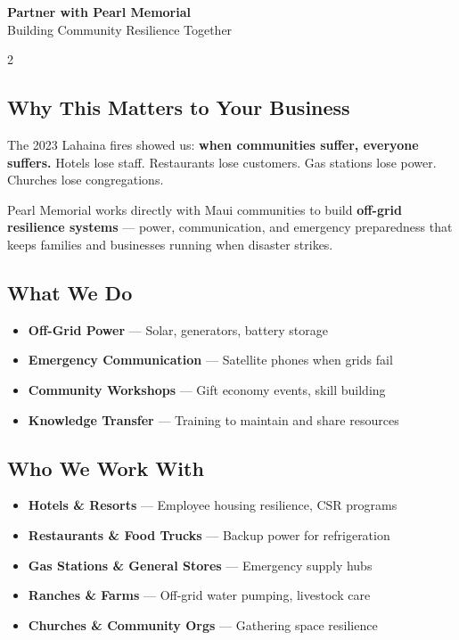 \documentclass[9pt,a4paper]{article}
\begin{document}
\begin{center}
{\LARGE \textbf{Partner with Pearl Memorial}}\\[3pt]
{\large Building Community Resilience Together}
\end{center}

\vspace{8pt}

\begin{multicols}{2}

\subsection*{Why This Matters to Your Business}
The 2023 Lahaina fires showed us: \textbf{when communities suffer, everyone suffers.} Hotels lose staff. Restaurants lose customers. Gas stations lose power. Churches lose congregations.

Pearl Memorial works directly with Maui communities to build \textbf{off-grid resilience systems} — power, communication, and emergency preparedness that keeps families and businesses running when disaster strikes.

\subsection*{What We Do}
\begin{itemize}
\item \textbf{Off-Grid Power} — Solar, generators, battery storage
\item \textbf{Emergency Communication} — Satellite phones when grids fail
\item \textbf{Community Workshops} — Gift economy events, skill building
\item \textbf{Knowledge Transfer} — Training to maintain and share resources
\end{itemize}

\subsection*{Who We Work With}
\begin{itemize}
\item \textbf{Hotels \& Resorts} — Employee housing resilience, CSR programs
\item \textbf{Restaurants \& Food Trucks} — Backup power for refrigeration
\item \textbf{Gas Stations \& General Stores} — Emergency supply hubs
\item \textbf{Ranches \& Farms} — Off-grid water pumping, livestock care
\item \textbf{Churches \& Community Orgs} — Gathering space resilience
\end{itemize}


\end{multicols}
\end{document}
